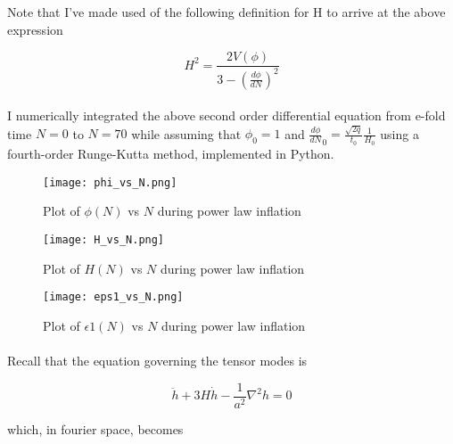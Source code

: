 \documentclass[12pt,a4paper,oneside]{book}
\begin{document}
\noindent Note that I've made used of the following definition for H to arrive at the above expression

\begin{equation}
H^2 = \frac{2V(\phi)}{3-(\frac{d\phi}{dN})^2}
\end{equation}

\paragraph*{} I numerically integrated the above second order differential equation from e-fold time $N = 0$ to $N = 70$ while assuming that $\phi_0 = 1$ and $\frac{d\phi}{dN}_0 = \frac{\sqrt{2q}}{t_0}\frac{1}{H_0}$ using a fourth-order Runge-Kutta method, implemented in Python.

\begin{figure}
\begin{center}
\texttt{[image: phi\_vs\_N.png]}
\caption[Plot of $\phi(N)$ vs $N$ during power law inflation]{Plot of $\phi(N)$ vs $N$ during power law inflation}
\label{blah}
\end{center}
\end{figure}

\begin{figure}
\begin{center}
\texttt{[image: H\_vs\_N.png]}
\caption[Plot of $H(N)$ vs $N$ during power law inflation]{Plot of $H(N)$ vs $N$ during power law inflation}
\label{blah}
\end{center}
\end{figure}

\begin{figure}
\begin{center}
\texttt{[image: eps1\_vs\_N.png]}
\caption[Plot of $\epsilon 1(N)$ vs $N$ during power law inflation]{Plot of $\epsilon 1(N)$ vs $N$ during power law inflation}
\label{blah}
\end{center}
\end{figure}

\paragraph*{} Recall that the equation governing the tensor modes is

\begin{equation}
\ddot{h} + 3H\dot{h} - \frac{1}{a^2}\nabla ^2h = 0
\end{equation}

\noindent which, in fourier space, becomes
\end{document}
